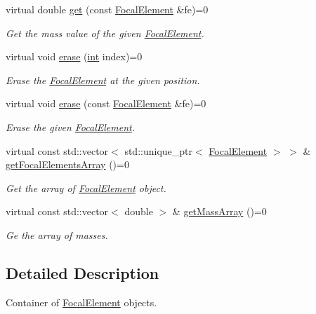 \begin{DoxyCompactItemize}
virtual double \hyperlink{classFocalElementContainer_a5ffaa25475069d4868cec5a73ccf314f}{get} (const \hyperlink{classFocalElement}{Focal\+Element} \&fe)=0
\begin{DoxyCompactList}\small\item\em Get the mass value of the given \hyperlink{classFocalElement}{Focal\+Element}. \end{DoxyCompactList}\item 
virtual void \hyperlink{classFocalElementContainer_aaf91ad85eeb5b218171a142d7c3e1116}{erase} (\hyperlink{CMakeCache_8txt_a79a3d8790b2588b09777910863574e09}{int} index)=0
\begin{DoxyCompactList}\small\item\em Erase the \hyperlink{classFocalElement}{Focal\+Element} at the given position. \end{DoxyCompactList}\item 
virtual void \hyperlink{classFocalElementContainer_af20780adab46a8d4e5b42c8b1934ea86}{erase} (const \hyperlink{classFocalElement}{Focal\+Element} \&fe)=0
\begin{DoxyCompactList}\small\item\em Erase the given \hyperlink{classFocalElement}{Focal\+Element}. \end{DoxyCompactList}\item 
virtual const std\+::vector$<$ std\+::unique\+\_\+ptr$<$ \hyperlink{classFocalElement}{Focal\+Element} $>$ $>$ \& \hyperlink{classFocalElementContainer_aa06ed4c0c21777cdc5256b576dc5e718}{get\+Focal\+Elements\+Array} ()=0
\begin{DoxyCompactList}\small\item\em Get the array of \hyperlink{classFocalElement}{Focal\+Element} object. \end{DoxyCompactList}\item 
virtual const std\+::vector$<$ double $>$ \& \hyperlink{classFocalElementContainer_a9197229964bfdf8765f81bf7b85c669d}{get\+Mass\+Array} ()=0
\begin{DoxyCompactList}\small\item\em Ge the array of masses. \end{DoxyCompactList}\end{DoxyCompactItemize}


\subsection{Detailed Description}
Container of \hyperlink{classFocalElement}{Focal\+Element} objects. 

